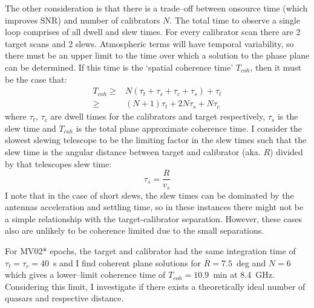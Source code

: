 		The other consideration is that there is a trade--off between onsource time (which improves SNR) and number of calibrators $N$. The total time to observe a single loop comprises of all dwell and slew times. For every calibrator scan there are 2 target scans and 2 slews. Atmospheric terms will have temporal variability, so there must be an upper limit to the time over which a solution to the phase plane can be determined. If this time is the `spatial coherence time' $T_{coh}$, then it must be the case that:
		\begin{equation}
		\begin{split}
			 T_{coh} \ge& N\left(\tau_t + \tau_s + \tau_c + \tau_s \right) + \tau_t \\
					 \ge&\left(N + 1\right)\tau_t + 2N\tau_s + N\tau_c 
		\end{split}
		\label{eq:onsourcetime}
		\end{equation} where $\tau_t$, $\tau_c$ are dwell times for the calibrators and target respectively, $\tau_s$ is the slew time and $T_{coh}$ is the total plane approximate coherence time. I consider the slowest slewing telescope to be the limiting factor in the slew times such that the slew time is the angular distance between target and calibrator (aka. $R$) divided by that telescopes slew time: $$\tau_s = \frac{R}{v_s}$$ I note that in the case of short slews, the slew times can be dominated by the antennas acceleration and settling time, so in these instances there might not be a simple relationship with the target-calibrator separation. However, these cases also are unlikely to be coherence limited due to the small separations.
		
		For MV02* epochs, the target and calibrator had the same integration time of $\tau_t = \tau_c = 40$~s and I find coherent plane solutions for $\overline{R}=7.5$~deg and $N=6$ which gives a lower--limit coherence time of $T_{coh}=10.9$~min at 8.4~GHz. Considering this limit, I investigate if there exists a theoretically ideal number of quasars and respective distance.
		

